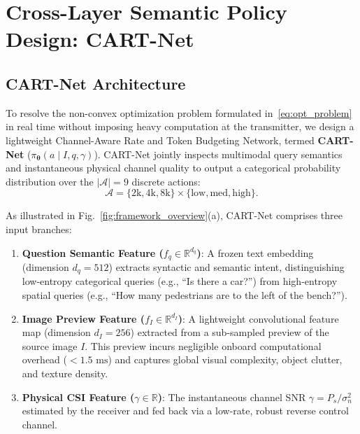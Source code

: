 \section{Cross-Layer Semantic Policy Design: CART-Net}\label{sec:policy}

\subsection{CART-Net Architecture}
To resolve the non-convex optimization problem formulated in~\eqref{eq:opt_problem} in real time without imposing heavy computation at the transmitter, we design a lightweight Channel-Aware Rate and Token Budgeting Network, termed \textbf{CART-Net} ($\pi_{\boldsymbol{\theta}}(a \mid I, q, \gamma)$). CART-Net jointly inspects multimodal query semantics and instantaneous physical channel quality to output a categorical probability distribution over the $|\mathcal{A}| = 9$ discrete actions:
\begin{equation}
\mathcal{A} = \{2\text{k}, 4\text{k}, 8\text{k}\} \times \{\mathrm{low}, \mathrm{med}, \mathrm{high}\}.
\end{equation}

As illustrated in Fig.~\ref{fig:framework_overview}(a), CART-Net comprises three input branches:
\begin{enumerate}
    \item \textbf{Question Semantic Feature ($f_q \in \mathbb{R}^{d_q}$)}: A frozen text embedding (dimension $d_q = 512$) extracts syntactic and semantic intent, distinguishing low-entropy categorical queries (e.g., ``Is there a car?'') from high-entropy spatial queries (e.g., ``How many pedestrians are to the left of the bench?'').
    \item \textbf{Image Preview Feature ($f_I \in \mathbb{R}^{d_I}$)}: A lightweight convolutional feature map (dimension $d_I = 256$) extracted from a sub-sampled preview of the source image $I$. This preview incurs negligible onboard computational overhead ($< 1.5\text{ ms}$) and captures global visual complexity, object clutter, and texture density.
    \item \textbf{Physical CSI Feature ($\gamma \in \mathbb{R}$)}: The instantaneous channel SNR $\gamma = P_s / \sigma_n^2$ estimated by the receiver and fed back via a low-rate, robust reverse control channel.
\end{enumerate}

